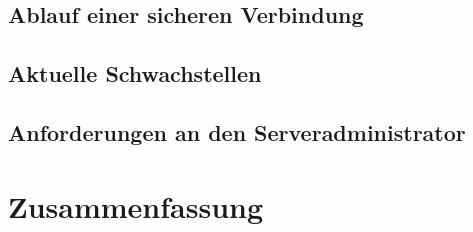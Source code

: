 \documentclass[ngerman,pdf]{wkcms}    %
\begin{document}
\subsection{Ablauf einer sicheren Verbindung}
\subsection{Aktuelle Schwachstellen}
\subsection{Anforderungen an den Serveradministrator}


\newpage


\section{Zusammenfassung}




\end{document}

